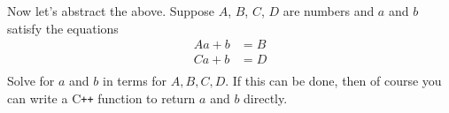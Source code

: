 Now let's abstract the above. Suppose $A$, $B$, $C$, $D$ are
numbers and $a$ and $b$ satisfy the equations
\begin{align*}
 Aa + b &= B \\
 Ca + b &= D \\
\end{align*}
Solve for $a$ and $b$ in terms for $A, B, C, D$. If this can be
done, then of course you can write a C\texttt{++} function to return $a$
and $b$ directly.
